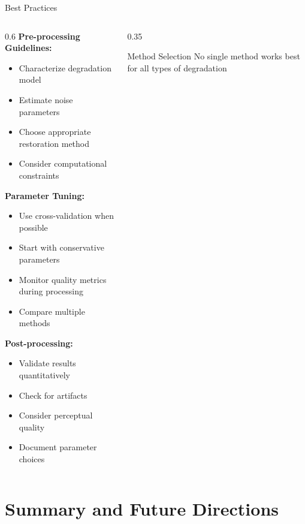 \documentclass[aspectratio=169,10pt]{beamer}
\begin{document}
\begin{frame}{Best Practices}
    \begin{columns}[T]
        \begin{column}{0.6\textwidth}
            \textbf{Pre-processing Guidelines:}
            \begin{itemize}
                \item Characterize degradation model
                \item Estimate noise parameters
                \item Choose appropriate restoration method
                \item Consider computational constraints
            \end{itemize}

            \textbf{Parameter Tuning:}
            \begin{itemize}
                \item Use cross-validation when possible
                \item Start with conservative parameters
                \item Monitor quality metrics during processing
                \item Compare multiple methods
            \end{itemize}

            \textbf{Post-processing:}
            \begin{itemize}
                \item Validate results quantitatively
                \item Check for artifacts
                \item Consider perceptual quality
                \item Document parameter choices
            \end{itemize}
        \end{column}
        \begin{column}{0.35\textwidth}
            \begin{insight}{Method Selection}{}
                No single method works best for all types of degradation
            \end{insight}
        \end{column}
    \end{columns}
\end{frame}

\section{Summary and Future Directions}
\end{document}
